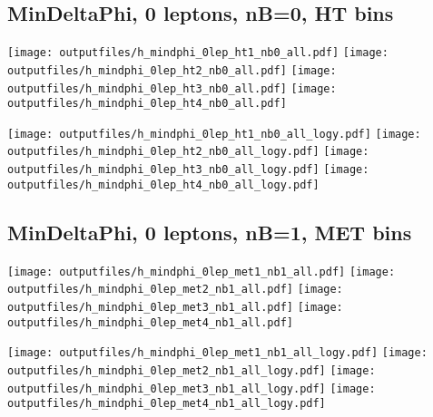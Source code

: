 \documentclass[11pt]{article}
\begin{document}
    \clearpage



    \subsection{ MinDeltaPhi, 0 leptons, nB=0, HT bins }

    \noindent
     \texttt{[image: outputfiles/h\_mindphi\_0lep\_ht1\_nb0\_all.pdf]}
     \texttt{[image: outputfiles/h\_mindphi\_0lep\_ht2\_nb0\_all.pdf]}
     \texttt{[image: outputfiles/h\_mindphi\_0lep\_ht3\_nb0\_all.pdf]}
     \texttt{[image: outputfiles/h\_mindphi\_0lep\_ht4\_nb0\_all.pdf]}

    \noindent
     \texttt{[image: outputfiles/h\_mindphi\_0lep\_ht1\_nb0\_all\_logy.pdf]}
     \texttt{[image: outputfiles/h\_mindphi\_0lep\_ht2\_nb0\_all\_logy.pdf]}
     \texttt{[image: outputfiles/h\_mindphi\_0lep\_ht3\_nb0\_all\_logy.pdf]}
     \texttt{[image: outputfiles/h\_mindphi\_0lep\_ht4\_nb0\_all\_logy.pdf]}

    \clearpage


    \subsection{ MinDeltaPhi, 0 leptons, nB=1, MET bins }

    \noindent
     \texttt{[image: outputfiles/h\_mindphi\_0lep\_met1\_nb1\_all.pdf]}
     \texttt{[image: outputfiles/h\_mindphi\_0lep\_met2\_nb1\_all.pdf]}
     \texttt{[image: outputfiles/h\_mindphi\_0lep\_met3\_nb1\_all.pdf]}
     \texttt{[image: outputfiles/h\_mindphi\_0lep\_met4\_nb1\_all.pdf]}

    \noindent
     \texttt{[image: outputfiles/h\_mindphi\_0lep\_met1\_nb1\_all\_logy.pdf]}
     \texttt{[image: outputfiles/h\_mindphi\_0lep\_met2\_nb1\_all\_logy.pdf]}
     \texttt{[image: outputfiles/h\_mindphi\_0lep\_met3\_nb1\_all\_logy.pdf]}
     \texttt{[image: outputfiles/h\_mindphi\_0lep\_met4\_nb1\_all\_logy.pdf]}

    \clearpage


\end{document}
